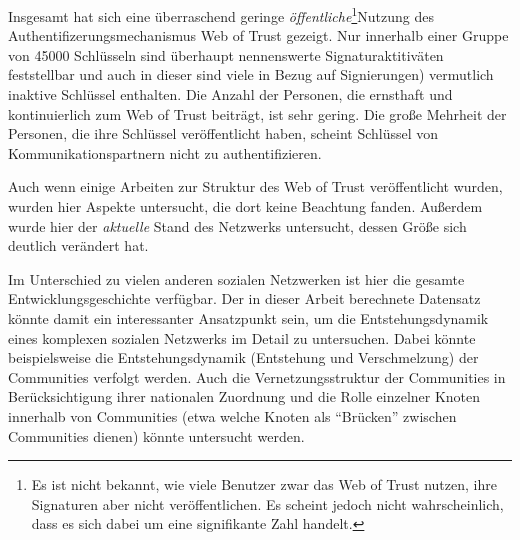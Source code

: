 Insgesamt hat sich eine überraschend geringe
\emph{öffentliche}\footnote{Es ist nicht bekannt, wie viele Benutzer
  zwar das Web of Trust nutzen, ihre Signaturen aber nicht
  veröffentlichen. Es scheint jedoch nicht wahrscheinlich, dass es
  sich dabei um eine signifikante Zahl handelt.}Nutzung des
Authentifizerungsmechanismus Web of Trust gezeigt. Nur innerhalb einer Gruppe
von 45000 Schlüsseln sind überhaupt nennenswerte
Signaturaktitiväten feststellbar und auch in dieser sind viele in
Bezug auf Signierungen) vermutlich inaktive Schlüssel enthalten. Die
Anzahl der Personen, die ernsthaft und kontinuierlich zum Web of Trust
beiträgt, ist sehr gering. Die große Mehrheit der Personen, die
ihre Schlüssel veröffentlicht haben, scheint Schlüssel von
Kommunikationspartnern nicht zu authentifizieren.

Auch wenn einige Arbeiten zur Struktur des Web of Trust
veröffentlicht wurden, wurden hier Aspekte untersucht, die dort
keine Beachtung fanden. Außerdem wurde hier der \emph{aktuelle} Stand
des Netzwerks untersucht, dessen Größe sich deutlich verändert
hat.

Im Unterschied zu vielen anderen sozialen Netzwerken ist hier die
gesamte Entwicklungsgeschichte verfügbar. Der in dieser Arbeit
berechnete Datensatz könnte damit ein interessanter Ansatzpunkt
sein, um die Entstehungsdynamik eines komplexen sozialen Netzwerks im
Detail zu untersuchen. Dabei könnte beispielsweise die
Entstehungsdynamik (Entstehung und Verschmelzung) der Communities
verfolgt werden. Auch die Vernetzungsstruktur der Communities in
Berücksichtigung ihrer nationalen Zuordnung und die Rolle einzelner
Knoten innerhalb von Communities (etwa welche Knoten als "`Brücken"'
zwischen Communities dienen) könnte untersucht
werden.

